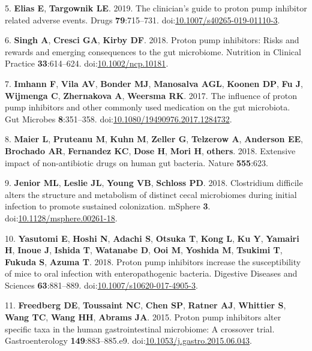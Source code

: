 \documentclass[11pt,]{article}
\begin{document}
\hypertarget{ref-Elias2019}{}
5. \textbf{Elias E}, \textbf{Targownik LE}. 2019. The clinician's guide
to proton pump inhibitor related adverse events. Drugs
\textbf{79}:715--731.
doi:\href{https://doi.org/10.1007/s40265-019-01110-3}{10.1007/s40265-019-01110-3}.

\hypertarget{ref-Singh2018}{}
6. \textbf{Singh A}, \textbf{Cresci GA}, \textbf{Kirby DF}. 2018. Proton
pump inhibitors: Risks and rewards and emerging consequences to the gut
microbiome. Nutrition in Clinical Practice \textbf{33}:614--624.
doi:\href{https://doi.org/10.1002/ncp.10181}{10.1002/ncp.10181}.

\hypertarget{ref-Imhann2017}{}
7. \textbf{Imhann F}, \textbf{Vila AV}, \textbf{Bonder MJ},
\textbf{Manosalva AGL}, \textbf{Koonen DP}, \textbf{Fu J},
\textbf{Wijmenga C}, \textbf{Zhernakova A}, \textbf{Weersma RK}. 2017.
The influence of proton pump inhibitors and other commonly used
medication on the gut microbiota. Gut Microbes \textbf{8}:351--358.
doi:\href{https://doi.org/10.1080/19490976.2017.1284732}{10.1080/19490976.2017.1284732}.

\hypertarget{ref-maier2018extensive}{}
8. \textbf{Maier L}, \textbf{Pruteanu M}, \textbf{Kuhn M},
\textbf{Zeller G}, \textbf{Telzerow A}, \textbf{Anderson EE},
\textbf{Brochado AR}, \textbf{Fernandez KC}, \textbf{Dose H},
\textbf{Mori H}, \textbf{others}. 2018. Extensive impact of
non-antibiotic drugs on human gut bacteria. Nature \textbf{555}:623.

\hypertarget{ref-Jenior2018}{}
9. \textbf{Jenior ML}, \textbf{Leslie JL}, \textbf{Young VB},
\textbf{Schloss PD}. 2018. Clostridium difficile alters the structure
and metabolism of distinct cecal microbiomes during initial infection to
promote sustained colonization. mSphere \textbf{3}.
doi:\href{https://doi.org/10.1128/msphere.00261-18}{10.1128/msphere.00261-18}.

\hypertarget{ref-Yasutomi2018}{}
10. \textbf{Yasutomi E}, \textbf{Hoshi N}, \textbf{Adachi S},
\textbf{Otsuka T}, \textbf{Kong L}, \textbf{Ku Y}, \textbf{Yamairi H},
\textbf{Inoue J}, \textbf{Ishida T}, \textbf{Watanabe D}, \textbf{Ooi
M}, \textbf{Yoshida M}, \textbf{Tsukimi T}, \textbf{Fukuda S},
\textbf{Azuma T}. 2018. Proton pump inhibitors increase the
susceptibility of mice to oral infection with enteropathogenic bacteria.
Digestive Diseases and Sciences \textbf{63}:881--889.
doi:\href{https://doi.org/10.1007/s10620-017-4905-3}{10.1007/s10620-017-4905-3}.

\hypertarget{ref-Freedberg2015}{}
11. \textbf{Freedberg DE}, \textbf{Toussaint NC}, \textbf{Chen SP},
\textbf{Ratner AJ}, \textbf{Whittier S}, \textbf{Wang TC}, \textbf{Wang
HH}, \textbf{Abrams JA}. 2015. Proton pump inhibitors alter specific
taxa in the human gastrointestinal microbiome: A crossover trial.
Gastroenterology \textbf{149}:883--885.e9.
doi:\href{https://doi.org/10.1053/j.gastro.2015.06.043}{10.1053/j.gastro.2015.06.043}.
\end{document}
